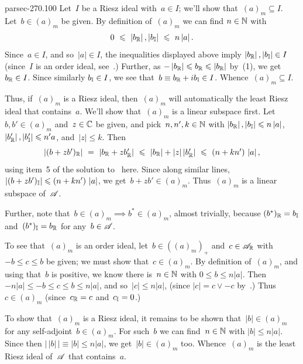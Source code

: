 \documentclass[b5page]{book}
\begin{document}
\begin{solution}{parsec-270.100}
Let~$I$ be a Riesz ideal with~$a\in I$;
we'll show that~$(a)_m \subseteq I$.
Let~$b\in (a)_m$ be given.
By definition of~$(a)_m$ we can
find $n\in \mathbb{N}$ with 
$$\textstyle 0\ \leqslant\  \left|b_{\mathbb{R}}\right|,
\left|b_{\mathbb{I}}\right|\ \leqslant\  n\left|a\right|.$$
Since~$a\in I$, and so~$\left|a\right|\in I$,
the inequalities displayed above imply
$\left|b_{\mathbb{R}}\right|,\left|b_{\mathbb{I}}\right|\in I$
(since~$I$ is an order ideal, 
see~.)
Further, as $-\left|b_{\mathbb{R}}\right|\leqslant b_{\mathbb{R}} \leqslant \left|b_{\mathbb{R}}\right|$
by~(1),
we get $b_{\mathbb{R}}\in I$.
Since similarly $b_{\mathbb{I}}\in I$,
we see that~$b\equiv b_{\mathbb{R}}+ib_{\mathbb{I}}\in I$.
Whence~$(a)_m\subseteq I$.

Thus, if~$(a)_m$ is a Riesz ideal,
then~$(a)_m$  will automatically the least Riesz ideal that contains~$a$.
We'll show that~$(a)_m$ is a linear subspace first.
Let $b,b'\in (a)_m$
and~$z\in\mathbb{C}$
be given, and pick~$n,n',k\in \mathbb{N}$ 
with $\left|b_{\mathbb{R}}\right|,\left|b_{\mathbb{I}}\right|
\leqslant n \left|a\right|$, 
$\left|b_{\mathbb{R}}'\right|,\left|b_{\mathbb{I}}'\right|\leqslant n'a$,
and~$\left|z\right|\leq k$.
Then 
$$\textstyle 
\left|(b+zb')_{\mathbb{R}}\right|
\ =\ \left|b_{\mathbb{R}}+zb_{\mathbb{R}}'\right|
\ \leqslant\  \left|b_{\mathbb{R}}\right|+\left|z\right| \left|b_{\mathbb{R}}'\right|
\ \leqslant\  (n+kn')\,\left|a\right|,
$$
using item~5 of the solution to~ here.
Since along similar lines, $\left|(b+zb')_{\mathbb{I}}\right|
\leqslant (n+kn')\,\left|a\right|$,
we get~$b+zb'\in (a)_m$.
Thus~$(a)_m$ is a linear subspace of~$\mathscr{A}$.

Further, note that~$b\in (a)_m\implies b^*\in(a)_m$,
almost trivially,
because  $(b^*)_{\mathbb{R}}=b_{\mathbb{I}}$
and~$(b^*)_{\mathbb{I}}=b_{\mathbb{R}}$
for any~$b\in\mathscr{A}$.

To see that~$(a)_m$ is an order ideal,
let~$b\in ((a)_m)_+$ and~$c\in \mathscr{A}_{\mathbb{R}}$
with~$-b\leq c\leq b$ be given;
we must show that~$c\in (a)_m$.
By definition of~$(a)_m$,
and using that~$b$ is positive,
we know there is~$n\in\mathbb{N}$ with
$0\leq b\leq n \left|a\right|$.
Then 
$-n\left|a\right| \leq -b \leq c \leq b \leq n\left| a\right| $,
and so~$\left|c\right| \leq n\left|a\right|$,
(since $\left|c\right|= c\vee -c$ by~.)
Thus~$c\in (a)_m$
(since~$c_{\mathbb{R}}=c$ and~$c_{\mathbb{I}}=0$.)

To show that~$(a)_m$ is a Riesz ideal,
it remains to be shown that~$\left|b\right|\in (a)_m$
for any self-adjoint~$b\in (a)_m$.
For such~$b$ we can find~$n\in\mathbb{N}$ with
$ \left|b\right|  \leq n\left|a\right|$.
Since then
 $\left| \,\left|b\right|\,\right|
\equiv \left|b\right| \leq n\left|a\right|$,
we get~$\left|b\right|\in(a)_m$ too.
Whence~$(a)_m$ is the least Riesz ideal of~$\mathscr{A}$
that contains~$a$.


\end{solution}
\end{document}
